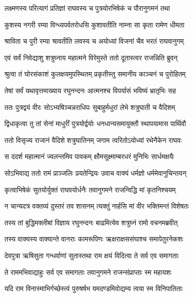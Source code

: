 \twolineshloka
{लक्ष्मणस्य परित्यागं प्रतिज्ञां राघवस्य च}
{पुत्रयोरभिषेकं च पौरानुगमनं तथा} %

\twolineshloka
{कुशस्य नगरी रम्या विन्ध्यपर्वतरोधसि}
{कुशावतीति नाम्ना सा कृता रामेण धीमता} %

\twolineshloka
{श्राविता च पुरी रम्या श्रावतीति लवस्य च}
{अयोध्यां विजनां चैव भरतं राघवानुगम्} %

\twolineshloka
{एवं सर्वं निवेद्याशु शत्रुघ्नाय महात्मने}
{विरेमुस्ते ततो दूतास्त्वर राजन्निति ब्रुवन्} %

\twolineshloka
{श्रुत्वा तं घोरसंकाशं कुलक्षयमुपस्थितम्}
{प्रकृतीस्तु समानीय काञ्चनं च पुरोहितम्} %

\twolineshloka
{तेषां सर्वं यथावृत्तमाख्याय रघुनन्दनः}
{आत्मनश्च विपर्यासं भविष्यं भ्रातृभिः सह} %

\twolineshloka
{ततः पुत्रद्वयं वीरः सोऽभ्यषिञ्चन्नराधिपः}
{सुबाहुर्मधुरां लेभे शत्रुघाती च वैदिशम्} %

\twolineshloka
{द्विधाकृत्वा तु तां सेनां माधुरीं पुत्रयोर्द्वयोः}
{धनधान्यसमायुक्तौ स्थापयामास पार्थिवौ} %

\twolineshloka
{ततो विसृज्य राजानं वैदिशे शत्रुघातिनम्}
{जगाम त्वरितोऽयोध्यां रथेनैकेन राघवः} %

\twolineshloka
{स ददर्श महात्मानं ज्वलन्तमिव पावकम्}
{क्षौमसूक्ष्माम्बरधरं मुनिभिः सार्धमक्षयैः} %

\twolineshloka
{सोऽभिवाद्य ततो रामं प्राञ्जलिः प्रयतेन्द्रियः}
{उवाच वाक्यं धर्मज्ञो धर्ममेवानुचिन्तयन्} %

\twolineshloka
{कृत्वाभिषेकं सुतयोर्युक्तं राघवयोर्धनैः}
{तवानुगमने राजन्विद्धि मां कृतनिश्चयम्} %

\twolineshloka
{न चान्यदत्र वक्तव्यं दुस्तरं तव शासनम्}
{त्यक्तुं नार्हसि मां वीर भक्तिमन्तं विशेषतः} %

\twolineshloka
{तस्य तां बुद्धिमक्लीबां विज्ञाय रघुनन्दनः}
{बाढमित्येव शत्रुघ्नं रामो वचनमब्रवीत्} %

\twolineshloka
{तस्य वाक्यस्य वाक्यान्ते वानराः कामरूपिणः}
{ऋक्षराक्षससंघाश्च समापेतुरनेकशः} %

\twolineshloka
{देवपुत्रा ऋषिसुता गन्धर्वाणां सुतास्तथा}
{राम क्षयं विदित्वा ते सर्व एव समागताः} %

\twolineshloka
{ते राममभिवाद्याहुः सर्व एव समागताः}
{तवानुगमने राजन्संप्राप्ताः स्म महायशः} %

\twolineshloka
{यदि राम विनास्माभिर्गच्छेस्त्वं पुरुषर्षभ}
{यमदण्डमिवोद्यम्य त्वया स्म विनिपातिताः} %

